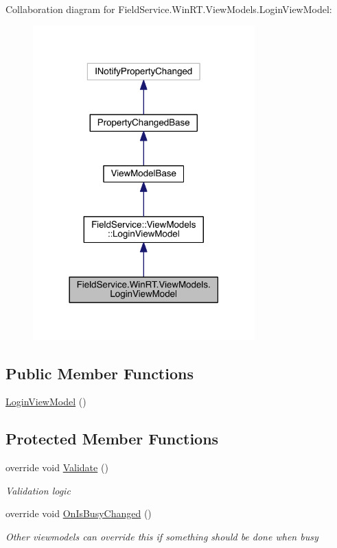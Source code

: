 Collaboration diagram for Field\+Service.\+Win\+R\+T.\+View\+Models.\+Login\+View\+Model\+:
\nopagebreak
\begin{figure}[H]
\begin{center}
\leavevmode
\includegraphics[width=242pt]{class_field_service_1_1_win_r_t_1_1_view_models_1_1_login_view_model__coll__graph}
\end{center}
\end{figure}
\subsection*{Public Member Functions}
\begin{DoxyCompactItemize}
\item 
\hyperlink{class_field_service_1_1_win_r_t_1_1_view_models_1_1_login_view_model_a11b7ee01cb39c54ae6c9b2f88eb06257}{Login\+View\+Model} ()
\end{DoxyCompactItemize}
\subsection*{Protected Member Functions}
\begin{DoxyCompactItemize}
\item 
override void \hyperlink{class_field_service_1_1_win_r_t_1_1_view_models_1_1_login_view_model_ac068dc643a7e4c7b80b1668a69da6733}{Validate} ()
\begin{DoxyCompactList}\small\item\em Validation logic \end{DoxyCompactList}\item 
override void \hyperlink{class_field_service_1_1_win_r_t_1_1_view_models_1_1_login_view_model_ac1775d35d062112b2537bdbf7e895ddd}{On\+Is\+Busy\+Changed} ()
\begin{DoxyCompactList}\small\item\em Other viewmodels can override this if something should be done when busy \end{DoxyCompactList}\end{DoxyCompactItemize}
